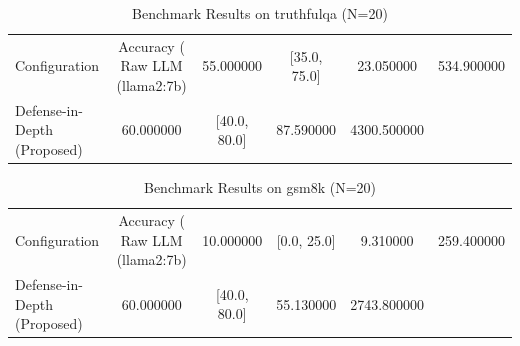 \begin{table}
\caption{Benchmark Results on truthfulqa (N=20)}
\label{tab:truthfulqa_benchmark}
\begin{tabular}{lcccc}
\toprule
Configuration & Accuracy (%
\midrule
Raw LLM (llama2:7b) & 55.000000 & [35.0, 75.0] & 23.050000 & 534.900000 \\
Defense-in-Depth (Proposed) & 60.000000 & [40.0, 80.0] & 87.590000 & 4300.500000 \\
\bottomrule
\end{tabular}
\end{table}

\begin{table}
\caption{Benchmark Results on gsm8k (N=20)}
\label{tab:gsm8k_benchmark}
\begin{tabular}{lcccc}
\toprule
Configuration & Accuracy (%
\midrule
Raw LLM (llama2:7b) & 10.000000 & [0.0, 25.0] & 9.310000 & 259.400000 \\
Defense-in-Depth (Proposed) & 60.000000 & [40.0, 80.0] & 55.130000 & 2743.800000 \\
\bottomrule
\end{tabular}
\end{table}
